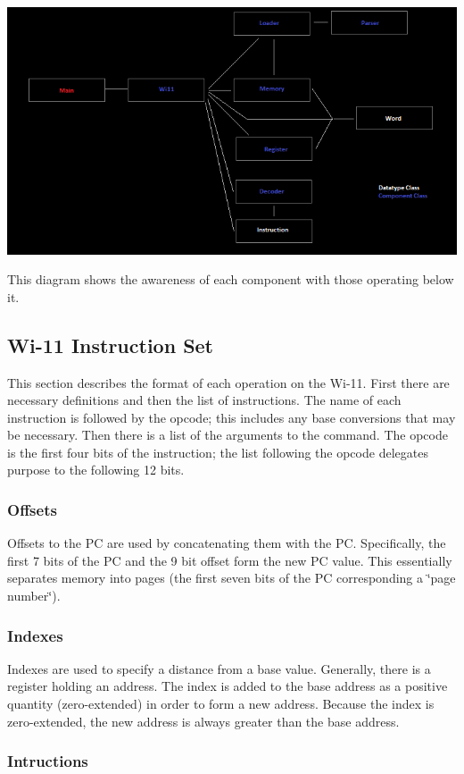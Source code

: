 \begin{DoxyImage}
\includegraphics[width=\textwidth]{software_interaction.png}
\caption{This diagram shows the awareness of each component with those operating below it.}
\end{DoxyImage}
\hypertarget{index_instructions}{}\subsection{Wi-\/11 Instruction Set}\label{index_instructions}
\begin{DoxyParagraph}{}
This section describes the format of each operation on the Wi-\/11. First there are necessary definitions and then the list of instructions. The name of each instruction is followed by the opcode; this includes any base conversions that may be necessary. Then there is a list of the arguments to the command. The opcode is the first four bits of the instruction; the list following the opcode delegates purpose to the following 12 bits.
\end{DoxyParagraph}
\hypertarget{index_offset}{}\subsubsection{Offsets}\label{index_offset}
Offsets to the PC are used by concatenating them with the PC. Specifically, the first 7 bits of the PC and the 9 bit offset form the new PC value. This essentially separates memory into pages (the first seven bits of the PC corresponding a \char`\"{}page number\char`\"{}).\hypertarget{index_indexes}{}\subsubsection{Indexes}\label{index_indexes}
Indexes are used to specify a distance from a base value. Generally, there is a register holding an address. The index is added to the base address as a positive quantity (zero-\/extended) in order to form a new address. Because the index is zero-\/extended, the new address is always greater than the base address.\hypertarget{index_inst}{}\subsubsection{Intructions}\label{index_inst}
